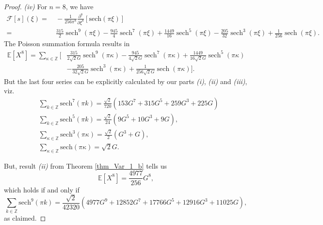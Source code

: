 \documentclass[12pt]{amsart}
\theoremstyle{definition}
\theoremstyle{remark}
\numberwithin{equation}{section}
\newcommand{\1}{\mathbbm{1}}
\begin{document}
\begin{proof}
\textit{(iv)} For $n=8$, we have
\begin{align*}
\mathcal{F}[s](\xi) =&\ -\frac{1}{256 \pi^8} \frac{\partial^8}{\partial\xi^8} \left[ \mathrm{sech}(\pi \xi)\right]\\
=&\ \frac{315}{2} \operatorname{sech}^9(\pi \xi) - \frac{945}{4} \operatorname{sech}^7(\pi \xi) + \frac{1449}{16}\operatorname{sech}^5 (\pi \xi) - \frac{205}{32} \operatorname{sech}^3(\pi \xi) + \frac{1}{256} \operatorname{sech}(\pi \xi).
\end{align*}
The Poisson summation formula results in
\begin{align*}
\mathbb{E}\left[X^8\right] = \sum_{\kappa \in \mathbb{Z}} \Bigg[ & \frac{315}{2\sqrt{2}G}\operatorname{sech}^9(\pi \kappa) - \frac{945}{4\sqrt{2}G} \operatorname{sech}^7 (\pi \kappa) + \frac{1449}{16\sqrt{2}G} \operatorname{sech}^5(\pi \kappa)\\ 
&- \frac{205}{32\sqrt{2}G} \operatorname{sech}^3(\pi \kappa) + \frac{1}{256 \sqrt{2}G} \operatorname{sech}(\pi \kappa) \Bigg].
\end{align*}
But the last four series can be explicitly calculated by our parts \textit{(i)}, \textit{(ii)} and \textit{(iii)}, viz.
\begin{align*}
& \sum_{k \in \mathbb{Z}} \mathrm{sech}^7(\pi k) = \frac{\sqrt{2}}{720}\left(153 G^7 + 315 G^5 + 259 G^3 + 225 G\right)\\
& \sum_{k \in \mathbb{Z}} \mathrm{sech}^5(\pi k) = \frac{\sqrt{2}}{24}\left(9 G^5 + 10 G^3 + 9 G\right), \\ & \sum_{\kappa \in \mathbb{Z}} \mathrm{sech}^3(\pi \kappa) = \frac{\sqrt{2}}{2} \left(G^3+G\right), \\ & \sum_{\kappa \in \mathbb{Z}} \mathrm{sech}(\pi \kappa) = \sqrt{2}G.
\end{align*}

But, result \textit{(ii)} from Theorem \ref{thm_Var_1_b} tells us
$$
\mathbb{E}\left[X^8\right] = \frac{4977}{256}G^8,
$$
which holds if and only if
$$
\sum_{k \in \mathbb{Z}} \mathrm{sech}^9(\pi k) = \frac{\sqrt{2}}{42320}\left(4977 G^9 + 12852 G^7 + 17766 G^5 + 12916 G^3 + 11025 G\right),
$$
as claimed.
\end{proof}

\vspace{1cm}
\end{document}
